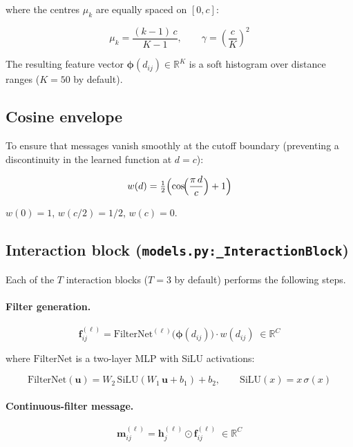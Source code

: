 \documentclass[11pt,a4paper]{article}
\newcommand{\R}{\mathbb{R}}
\newcommand{\bh}{\mathbf{h}}
\newcommand{\bphi}{\boldsymbol{\phi}}
\newcommand{\SiLU}{\mathrm{SiLU}}
\newcommand{\code}[1]{\texttt{#1}}
\begin{document}
where the centres $\mu_k$ are equally spaced on $[0, c]$:

\begin{equation}
\mu_k = \frac{(k-1)\,c}{K-1}, \qquad
\gamma = \left(\frac{c}{K}\right)^{\!2}
\end{equation}

The resulting feature vector $\bphi(d_{ij}) \in \R^K$ is a soft histogram over
distance ranges ($K = 50$ by default).

\subsection{Cosine envelope}

To ensure that messages vanish smoothly at the cutoff boundary (preventing
a discontinuity in the learned function at $d = c$):

\begin{equation}
w(d) = \tfrac{1}{2}\Bigl(\cos\!\Bigl(\frac{\pi\, d}{c}\Bigr) + 1\Bigr)
\label{eq:envelope}
\end{equation}

$w(0) = 1$, $w(c/2) = 1/2$, $w(c) = 0$.

\subsection{Interaction block (\code{models.py:\_InteractionBlock})}

Each of the $T$ interaction blocks ($T = 3$ by default) performs the following
steps.

\paragraph{Filter generation.}
\begin{equation}
\mathbf{f}_{ij}^{(\ell)}
= \mathrm{FilterNet}^{(\ell)}\!\bigl(\bphi(d_{ij})\bigr)
  \cdot w(d_{ij})
\;\in \R^C
\label{eq:filter}
\end{equation}

where $\mathrm{FilterNet}$ is a two-layer MLP with SiLU activations:

\begin{equation}
\mathrm{FilterNet}(\mathbf{u})
= W_2\,\SiLU(W_1\,\mathbf{u} + b_1) + b_2,
\qquad
\SiLU(x) = x\,\sigma(x)
\end{equation}

\paragraph{Continuous-filter message.}
\begin{equation}
\mathbf{m}_{ij}^{(\ell)}
= \bh_j^{(\ell)} \odot \mathbf{f}_{ij}^{(\ell)}
\;\in \R^C
\label{eq:cfconv}
\end{equation}
\end{document}
